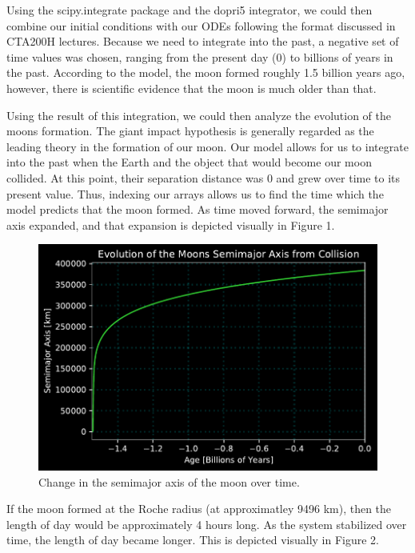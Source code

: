\documentclass{article}
\begin{document}
Using the scipy.integrate package and the dopri5 integrator, we could then combine our initial conditions with our ODEs following the format discussed in CTA200H lectures. Because we need to integrate into the past, a negative set of time values was chosen, ranging from the present day (0) to billions of years in the past. According to the model, the moon formed roughly 1.5 billion years ago, however, there is scientific evidence that the moon is much older than that.

Using the result of this integration, we could then analyze the evolution of the moons formation. The giant impact hypothesis is generally regarded as the leading theory in the formation of our moon. Our model allows for us to integrate into the past when the Earth and the object that would become our moon collided. At this point, their separation distance was 0 and grew over time to its present value. Thus, indexing our arrays allows us to find the time which the model predicts that the moon formed. As time moved forward, the semimajor axis expanded, and that expansion is depicted visually in Figure 1.

\begin{figure}[htp]
    \centering
    \includegraphics[width=12cm]{Q6.pdf}
    \caption{Change in the semimajor axis of the moon over time.}
    \label{fig:Q6}
\end{figure}

If the moon formed at the Roche radius (at approximatley 9496 km), then the length of day would be approximately 4 hours long. As the system stabilized over time, the length of day became longer. This is depicted visually in Figure 2. 
\end{document}
